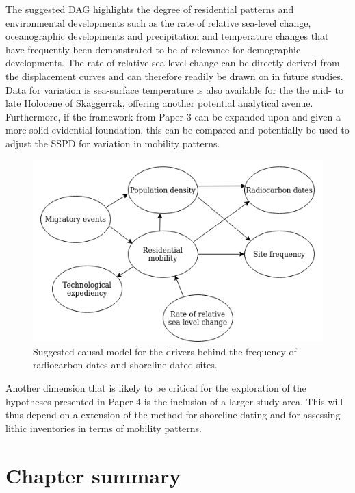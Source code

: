 \documentclass[
  12pt,
  a4paper,
  oneside]{book}
\begin{document}
The suggested DAG highlights the degree of residential patterns and environmental developments such as the rate of relative sea-level change, oceanographic developments and precipitation and temperature changes that have frequently been demonstrated to be of relevance for demographic developments. The rate of relative sea-level change can be directly derived from the displacement curves and can therefore readily be drawn on in future studies. Data for variation is sea-surface temperature is also available for the the mid- to late Holocene of Skaggerrak, offering another potential analytical avenue. Furthermore, if the framework from Paper 3 can be expanded upon and given a more solid evidential foundation, this can be compared and potentially be used to adjust the SSPD for variation in mobility patterns.

\begin{figure}

{\centering \includegraphics[width=1\linewidth]{figures/dag_paper4} 

}

\caption{Suggested causal model for the drivers behind the frequency of radiocarbon dates and shoreline dated sites.}\label{fig:d4}
\end{figure}

Another dimension that is likely to be critical for the exploration of the hypotheses presented in Paper 4 is the inclusion of a larger study area. This will thus depend on a extension of the method for shoreline dating and for assessing lithic inventories in terms of mobility patterns.

\hypertarget{chapter-summary-3}{%
\section{Chapter summary}\label{chapter-summary-3}}
\end{document}
